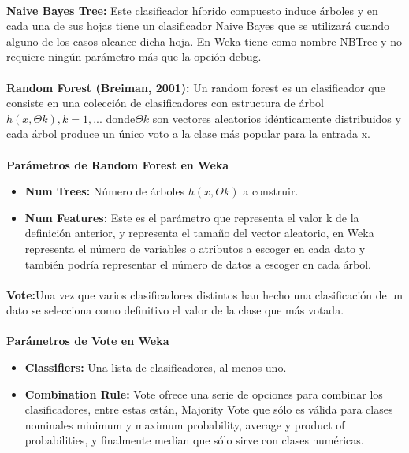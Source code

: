 \documentclass[es]{ifirak}
\begin{document}
\paragraph{}
\textbf{Naive Bayes Tree:} Este clasificador híbrido compuesto induce árboles y en cada una de sus hojas tiene un clasificador Naive Bayes que se utilizará cuando alguno de los casos alcance 
dicha hoja. En Weka tiene como nombre NBTree y no requiere ningún parámetro más que la opción debug.
\paragraph{}
\textbf{Random Forest (Breiman, 2001):} Un random forest es un clasificador que consiste en una colección de clasificadores con estructura de árbol ${h(x, \Theta k ), k = 1,...}$ donde$ {\Theta k }$ son vectores aleatorios idénticamente distribuidos y cada árbol produce un único voto a la clase más popular para la entrada x.

\paragraph{}
\textbf{Parámetros de Random Forest en Weka}
\begin{itemize}
\item\textbf{Num Trees:} Número de árboles $h(x, \Theta k )$ a construir.
\item\textbf{Num Features:} Este es el parámetro que representa el valor k de la definición anterior, y representa el tamaño del vector aleatorio, en Weka representa el número de variables o atributos a escoger en cada dato y también podría representar el número de datos a escoger en cada árbol.
\end{itemize}
\paragraph{}
\textbf{Vote:}Una vez que varios clasificadores distintos han hecho una clasificación de un dato se selecciona como definitivo el valor de la clase que más votada.
\paragraph{}
\textbf{Parámetros de Vote en Weka}
\begin{itemize}
\item\textbf{Classifiers:} Una lista de clasificadores, al menos uno.
\item\textbf{Combination Rule:} Vote ofrece una serie de opciones para combinar los clasificadores, entre estas están, Majority Vote que sólo es válida para clases nominales minimum y maximum probability, average y product of probabilities, y finalmente median que sólo sirve con clases numéricas.
\end{itemize}
\end{document}
